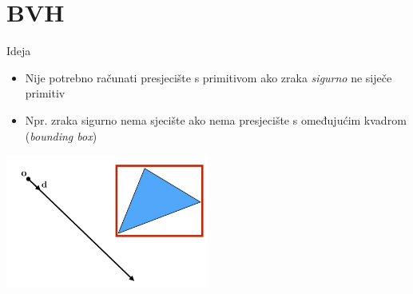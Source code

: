 \documentclass[9pt]{beamer}
\begin{document}
%



\section{BVH}

\begin{frame}{Ideja}
	\begin{itemize}
		\item Nije potrebno računati presjecište s primitivom ako zraka \textit{sigurno} ne siječe primitiv
		\item Npr. zraka sigurno nema sjecište ako nema presjecište s omeđujućim kvadrom (\textit{bounding box})
	\end{itemize}
\begin{center}
	\includegraphics[width=0.5\textwidth]{slike/slide_005.jpg}
\end{center}
\end{frame}
\end{document}
